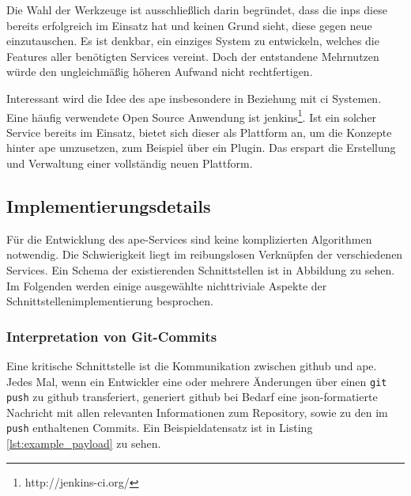 Die Wahl der Werkzeuge ist ausschließlich darin begründet, dass die \gls{inps} diese bereits erfolgreich im Einsatz hat und keinen Grund sieht, diese gegen neue einzutauschen. Es ist denkbar, ein einziges System zu entwickeln, welches die Features aller benötigten Services vereint. Doch der entstandene Mehrnutzen würde den ungleichmäßig höheren Aufwand nicht rechtfertigen.

Interessant wird die Idee des \gls{ape} insbesondere in Beziehung mit \gls{ci} Systemen. Eine häufig verwendete Open Source Anwendung ist \gls{jenkins}\footnote{http://jenkins-ci.org/}. Ist ein solcher Service bereits im Einsatz, bietet sich dieser als Plattform an, um die Konzepte hinter \gls{ape} umzusetzen, zum Beispiel über ein Plugin. Das erspart die Erstellung und Verwaltung einer vollständig neuen Plattform.


\subsection{Implementierungsdetails} %
\label{sub:implementierungsdetails}

Für die Entwicklung des \gls{ape}-Services sind keine komplizierten Algorithmen notwendig. Die Schwierigkeit liegt im reibungslosen Verknüpfen der verschiedenen Services. Ein Schema der existierenden Schnittstellen ist in Abbildung zu sehen. Im Folgenden werden einige ausgewählte nichttriviale Aspekte der Schnittstellenimplementierung besprochen.

\subsubsection{Interpretation von Git-Commits} %
\label{ssub:interpretation_von_git_commits}

Eine kritische Schnittstelle ist die Kommunikation zwischen \gls{github} und \gls{ape}. Jedes Mal, wenn ein Entwickler eine oder mehrere Änderungen über einen \lstinline!git push! zu \gls{github} transferiert, generiert \gls{github} bei Bedarf eine \gls{json}-formatierte Nachricht mit allen relevanten Informationen zum Repository, sowie zu den im \lstinline!push! enthaltenen Commits. Ein Beispieldatensatz ist in Listing \ref{lst:example_payload} zu sehen.

